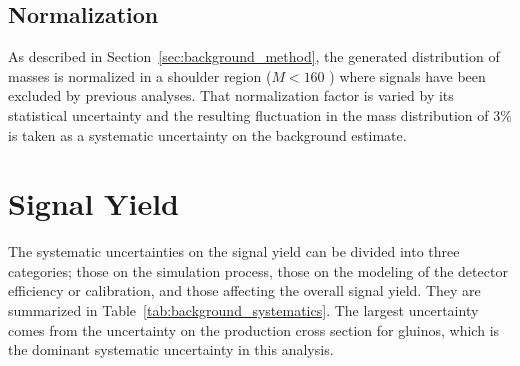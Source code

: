\subsection{Normalization}

As described in Section~\ref{sec:background_method}, the generated distribution of masses is normalized in a shoulder region ($M < 160$ \GeV) where signals have been excluded by previous analyses.
That normalization factor is varied by its statistical uncertainty and the resulting fluctuation in the mass distribution of 3\% is taken as a systematic uncertainty on the background estimate.

\section{Signal Yield}

The systematic uncertainties on the signal yield can be divided into three categories; those on the simulation process, those on the modeling of the detector efficiency or calibration, and those affecting the overall signal yield.
They are summarized in Table~\ref{tab:background_systematics}.
The largest uncertainty comes from the uncertainty on the production cross section for gluinos, which is the dominant systematic uncertainty in this analysis.

